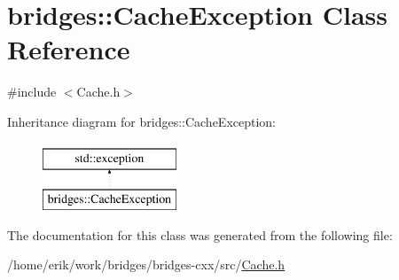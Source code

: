 \hypertarget{classbridges_1_1_cache_exception}{}\section{bridges\+:\+:Cache\+Exception Class Reference}
\label{classbridges_1_1_cache_exception}


{\ttfamily \#include $<$Cache.\+h$>$}

Inheritance diagram for bridges\+:\+:Cache\+Exception\+:\begin{figure}[H]
\begin{center}
\leavevmode
\includegraphics[height=2.000000cm]{classbridges_1_1_cache_exception}
\end{center}
\end{figure}


The documentation for this class was generated from the following file\+:\begin{DoxyCompactItemize}
\item 
/home/erik/work/bridges/bridges-\/cxx/src/\hyperlink{_cache_8h}{Cache.\+h}\end{DoxyCompactItemize}
